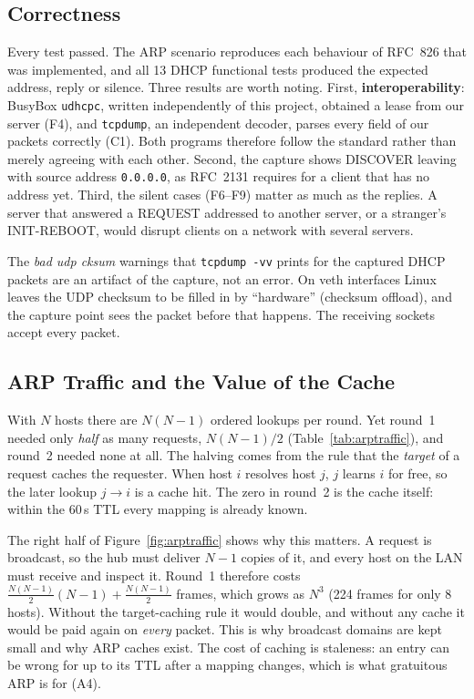 \documentclass[11pt]{article}
\begin{document}
\subsection{Correctness}
Every test passed. The ARP scenario reproduces each behaviour of RFC~826 that was
implemented, and all 13 DHCP functional tests produced the expected address, reply or
silence. Three results are worth noting. First, \textbf{interoperability}: BusyBox
\texttt{udhcpc}, written independently of this project, obtained a lease from our server
(F4), and \texttt{tcpdump}, an independent decoder, parses every field of our packets
correctly (C1). Both programs therefore follow the standard rather than merely agreeing
with each other. Second, the capture shows DISCOVER leaving with source address
\texttt{0.0.0.0}, as RFC~2131 requires for a client that has no address yet. Third, the
silent cases (F6--F9) matter as much as the replies. A server that answered a REQUEST
addressed to another server, or a stranger's INIT-REBOOT, would disrupt clients on a
network with several servers.

The \emph{bad udp cksum} warnings that \texttt{tcpdump -vv} prints for the captured DHCP
packets are an artifact of the capture, not an error. On veth interfaces Linux leaves the
UDP checksum to be filled in by ``hardware'' (checksum offload), and the capture point
sees the packet before that happens. The receiving sockets accept every packet.

\subsection{ARP Traffic and the Value of the Cache}
\label{sec:arpanalysis}
With $N$ hosts there are $N(N-1)$ ordered lookups per round. Yet round~1 needed only
\emph{half} as many requests, $N(N-1)/2$ (Table~\ref{tab:arptraffic}), and round~2 needed
none at all. The halving comes from the rule that the \emph{target} of a request caches
the requester. When host $i$ resolves host $j$, $j$ learns $i$ for free, so the later
lookup $j\to i$ is a cache hit. The zero in round~2 is the cache itself: within the
60\,s TTL every mapping is already known.

The right half of Figure~\ref{fig:arptraffic} shows why this matters. A request is
broadcast, so the hub must deliver $N-1$ copies of it, and every host on the LAN must
receive and inspect it. Round~1 therefore costs $\frac{N(N-1)}{2}(N-1) + \frac{N(N-1)}{2}$
frames, which grows as $N^3$ (224 frames for only 8 hosts). Without the target-caching
rule it would double, and without any cache it would be paid again on \emph{every}
packet. This is why broadcast domains are kept small and why ARP caches exist. The cost
of caching is staleness: an entry can be wrong for up to its TTL after a mapping changes,
which is what gratuitous ARP is for (A4).
\end{document}
